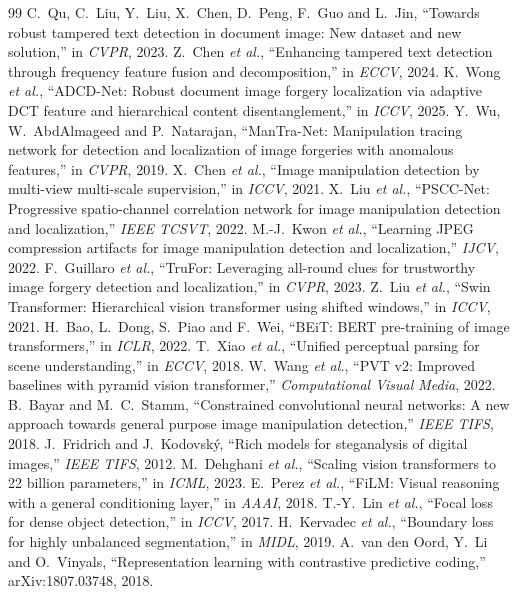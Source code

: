 \documentclass[11pt,a4paper]{article}
\begin{document}
\begin{thebibliography}{99}\small
{} C.~Qu, C.~Liu, Y.~Liu, X.~Chen, D.~Peng, F.~Guo and L.~Jin, ``Towards robust
  tampered text detection in document image: New dataset and new solution,'' in \emph{CVPR},
  2023.
 Z.~Chen \emph{et al.}, ``Enhancing tampered text detection through frequency
  feature fusion and decomposition,'' in \emph{ECCV}, 2024.
 K.~Wong \emph{et al.}, ``ADCD-Net: Robust document image forgery localization
  via adaptive DCT feature and hierarchical content disentanglement,'' in \emph{ICCV}, 2025.
 Y.~Wu, W.~AbdAlmageed and P.~Natarajan, ``ManTra-Net: Manipulation tracing
  network for detection and localization of image forgeries with anomalous features,'' in
  \emph{CVPR}, 2019.
 X.~Chen \emph{et al.}, ``Image manipulation detection by multi-view
  multi-scale supervision,'' in \emph{ICCV}, 2021.
 X.~Liu \emph{et al.}, ``PSCC-Net: Progressive spatio-channel correlation network
  for image manipulation detection and localization,'' \emph{IEEE TCSVT}, 2022.
 M.-J.~Kwon \emph{et al.}, ``Learning JPEG compression artifacts for image
  manipulation detection and localization,'' \emph{IJCV}, 2022.
 F.~Guillaro \emph{et al.}, ``TruFor: Leveraging all-round clues for
  trustworthy image forgery detection and localization,'' in \emph{CVPR}, 2023.
 Z.~Liu \emph{et al.}, ``Swin Transformer: Hierarchical vision transformer using
  shifted windows,'' in \emph{ICCV}, 2021.
 H.~Bao, L.~Dong, S.~Piao and F.~Wei, ``BEiT: BERT pre-training of image
  transformers,'' in \emph{ICLR}, 2022.
 T.~Xiao \emph{et al.}, ``Unified perceptual parsing for scene understanding,''
  in \emph{ECCV}, 2018.
 W.~Wang \emph{et al.}, ``PVT v2: Improved baselines with pyramid vision
  transformer,'' \emph{Computational Visual Media}, 2022.
 B.~Bayar and M.~C.~Stamm, ``Constrained convolutional neural networks: A new
  approach towards general purpose image manipulation detection,'' \emph{IEEE TIFS}, 2018.
 J.~Fridrich and J.~Kodovsk\'y, ``Rich models for steganalysis of digital
  images,'' \emph{IEEE TIFS}, 2012.
 M.~Dehghani \emph{et al.}, ``Scaling vision transformers to 22 billion
  parameters,'' in \emph{ICML}, 2023.
 E.~Perez \emph{et al.}, ``FiLM: Visual reasoning with a general conditioning
  layer,'' in \emph{AAAI}, 2018.
 T.-Y.~Lin \emph{et al.}, ``Focal loss for dense object detection,'' in
  \emph{ICCV}, 2017.
 H.~Kervadec \emph{et al.}, ``Boundary loss for highly unbalanced
  segmentation,'' in \emph{MIDL}, 2019.
 A.~van den Oord, Y.~Li and O.~Vinyals, ``Representation learning with
  contrastive predictive coding,'' arXiv:1807.03748, 2018.
\end{thebibliography}
\end{document}
